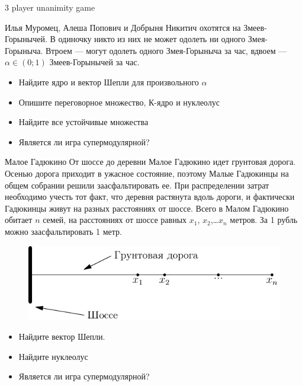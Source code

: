\begin{problem}
3 player unanimity game


Илья Муромец, Алеша Попович и Добрыня Никитич охотятся на Змеев-Горынычей. В одиночку никто из них не может одолеть ни одного Змея-Горыныча. Втроем — могут одолеть одного Змея-Горыныча за час, вдвоем — $\alpha\in (0;1)$ Змеев-Горынычей за час.
\begin{itemize}
\item Найдите ядро и вектор Шепли для произвольного $\alpha$
\item Опишите переговорное множество, К-ядро и нуклеолус
\item Найдите все устойчивые множества

\item Является ли игра супермодулярной?
\end{itemize}



\begin{sol}

\end{sol}
\end{problem}




\begin{problem}
Малое Гадюкино
От шоссе до деревни Малое Гадюкино идет грунтовая дорога. Осенью дорога приходит в ужасное состояние, поэтому Малые Гадюкинцы на общем собрании решили заасфальтировать ее. При распределении затрат необходимо учесть тот факт, что деревня растянута вдоль дороги, и фактически Гадюкинцы живут на разных расстояниях от шоссе. Всего в Малом Гадюкино обитает  $n$  семей, на расстояниях от шоссе равных  $x_{1}$,  $x_{2}$,\ldots  $x_{n}$ метров. За 1 рубль можно заасфальтировать 1 метр.

\begin{figure}[htbp]
	\includegraphics{coop_gadukino.pdf}
\end{figure}

\begin{itemize}
\item Найдите вектор Шепли.
\item Найдите нуклеолус

\item Является ли игра супермодулярной?
\end{itemize}



\begin{sol}

\end{sol}
\end{problem}



